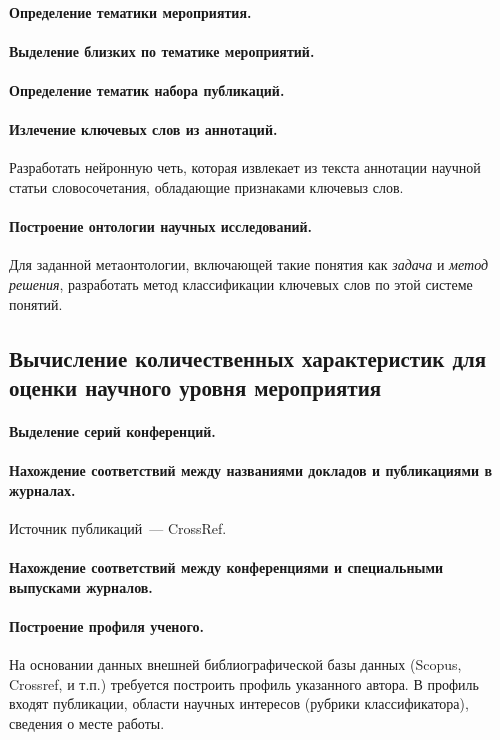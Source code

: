 \documentclass[12pt,oneside]{article}
\begin{document}
\paragraph{Определение тематики мероприятия.}
\paragraph{Выделение близких по тематике мероприятий.}
\paragraph{Определение тематик набора публикаций.}
\paragraph{Излечение ключевых слов из аннотаций.}
Разработать нейронную четь, которая извлекает из текста аннотации научной статьи словосочетания, обладающие признаками ключевыз слов.
\paragraph{Построение онтологии научных исследований.}
Для заданной метаонтологии, включающей такие понятия как \emph{задача} и \emph{метод решения}, разработать метод классификации ключевых слов по этой системе понятий.

\subsection{Вычисление количественных характеристик для оценки научного уровня мероприятия}
\paragraph{Выделение серий конференций.}
\paragraph{Нахождение соответствий между названиями докладов и публикациями в журналах.}
Источник публикаций~--- CrossRef.
\paragraph{Нахождение соответствий между конференциями и специальными выпусками журналов.}

\paragraph{Построение профиля ученого.} На основании данных внешней библиографической базы данных (Scopus, Crossref, и т.п.) требуется построить профиль указанного автора. В профиль входят публикации, области научных интересов (рубрики классификатора), сведения о месте работы.
\end{document}
